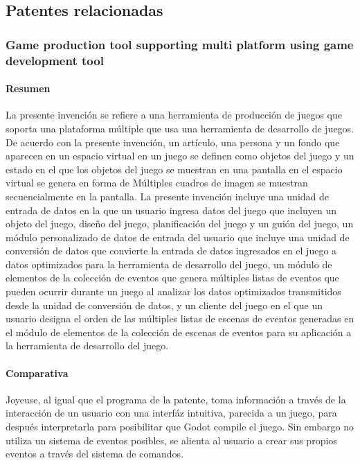 \documentclass[]{article}
\begin{document}
\subsection{Patentes relacionadas}

\subsubsection{Game production tool supporting multi platform using game development tool}

\paragraph{Resumen}
La presente invenci\'on se refiere a una herramienta de producci\'on de juegos que soporta una plataforma m\'ultiple que usa una herramienta de desarrollo de juegos. De acuerdo con la presente invenci\'on, un art\'iculo, una persona y un fondo que aparecen en un espacio virtual en un juego se definen como objetos del juego y un estado en el que los objetos del juego se muestran en una pantalla en el espacio virtual se genera en forma de M\'ultiples cuadros de imagen se muestran secuencialmente en la pantalla. La presente invenci\'on incluye una unidad de entrada de datos en la que un usuario ingresa datos del juego que incluyen un objeto del juego, dise\~no del juego, planificación del juego y un gui\'on del juego, un módulo personalizado de datos de entrada del usuario que incluye una unidad de conversi\'on de datos que convierte la entrada de datos ingresados en el juego a datos optimizados para la herramienta de desarrollo del juego, un m\'odulo de elementos de la colecci\'on de eventos que genera m\'ultiples listas de eventos que pueden ocurrir durante un juego al analizar los datos optimizados transmitidos desde la unidad de conversi\'on de datos, y un cliente del juego en el que un usuario designa el orden de las m\'ultiples listas de escenas de eventos generadas en el m\'odulo de elementos de la colecci\'on de escenas de eventos para su aplicaci\'on a la herramienta de desarrollo del juego.
\cite{multip}
\paragraph{Comparativa}
Joyeuse, al igual que el programa de la patente, toma informaci\'on a trav\'es de la interacci\'on de un usuario con una interf\'az intuitiva, parecida a un juego, para despu\'es interpretarla para posibilitar que Godot compile el juego. Sin embargo no utiliza un sistema de eventos posibles, se alienta al usuario a crear sus propios eventos a trav\'es del sistema de comandos. 
\end{document}
